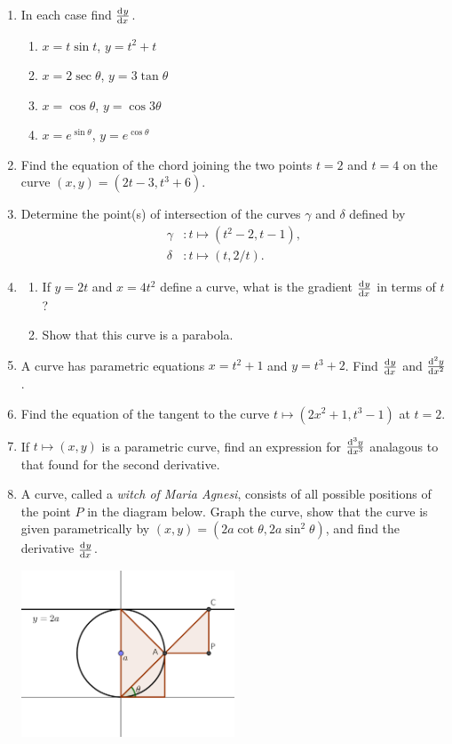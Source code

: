 \begin{enumerate}
  \item In each case find $ \od{y}{x} $.
    \begin{enumerate}
      \item $ x = t\sin t $, $ y = t^2 + t $
      \item $ x = 2 \sec \theta $, $ y = 3\tan \theta $
      \item $ x = \cos \theta $, $ y = \cos 3\theta $
      \item $ x = e^{\sin \theta} $, $ y = e^{\cos \theta} $
    \end{enumerate}
  \item Find the equation of the chord joining the two points $ t = 2 $ and $ t = 4 $ on the
        curve $ (x,y) = (2t - 3, t^3 + 6) $.
  \item Determine the point(s) of intersection of the curves $ \gamma $ and $ \delta $ defined by
        \begin{align*}
          \gamma &: t \mapsto (t^2 - 2, t - 1),\\
          \delta &: t \mapsto (t, 2/t).
        \end{align*}
  \item
    \begin{enumerate}
      \item If $ y = 2t $ and $ x = 4t^2 $ define a curve, what is the gradient $ \od{y}{x} $ in terms of $ t $?
      \item Show that this curve is a parabola.
    \end{enumerate}
  \item A curve has parametric equations $ x = t^2 + 1 $ and $ y = t^3 + 2 $. Find $ \od{y}{x} $ and $ \od[2]{y}{x} $.
  \item Find the equation of the tangent to the curve $ t \mapsto (2x^2 + 1, t^3 - 1) $ at $ t = 2 $.
  \item If $ t \mapsto (x, y) $ is a parametric curve, find an expression for $ \od[3]{y}{x} $ analagous to that found for
        the second derivative.
  \item A curve, called a \textit{witch of Maria Agnesi}, consists of all possible positions of the point $ P $ in
        the diagram below. Graph the curve, show that the curve is given parametrically by $ (x, y) = (2a \cot \theta, 2a \sin^2 \theta) $, and
        find the derivative $ \od{y}{x} $.
        \begin{center}
          \includegraphics[width=0.5\textwidth]{agnesi-geom}

\end{center}
\end{enumerate}
